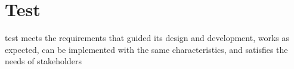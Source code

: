 \chapter{Test}

	test meets the requirements that guided its design and development,
	works as expected,
	can be implemented with the same characteristics,
	and satisfies the needs of stakeholders